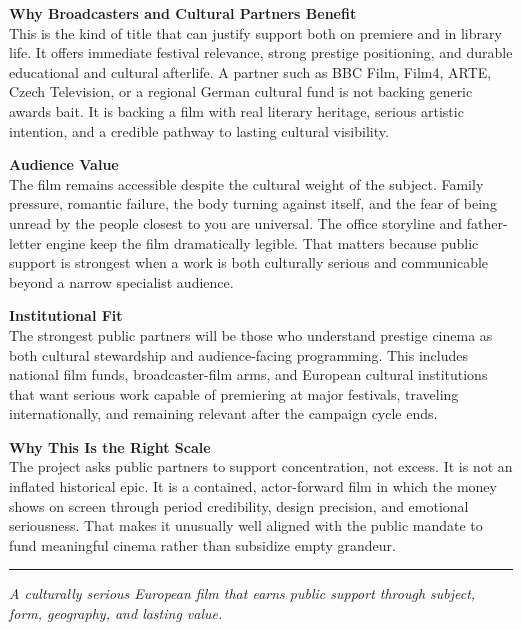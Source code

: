 \documentclass[11pt,letterpaper]{article}
\begin{document}
\textbf{Why Broadcasters and Cultural Partners Benefit}\\
This is the kind of title that can justify support both on premiere and in library life. It offers immediate festival relevance, strong prestige positioning, and durable educational and cultural afterlife. A partner such as BBC Film, Film4, ARTE, Czech Television, or a regional German cultural fund is not backing generic awards bait. It is backing a film with real literary heritage, serious artistic intention, and a credible pathway to lasting cultural visibility.

\vspace{2pt}

\textbf{Audience Value}\\
The film remains accessible despite the cultural weight of the subject. Family pressure, romantic failure, the body turning against itself, and the fear of being unread by the people closest to you are universal. The office storyline and father-letter engine keep the film dramatically legible. That matters because public support is strongest when a work is both culturally serious and communicable beyond a narrow specialist audience.

\vspace{2pt}

\textbf{Institutional Fit}\\
The strongest public partners will be those who understand prestige cinema as both cultural stewardship and audience-facing programming. This includes national film funds, broadcaster-film arms, and European cultural institutions that want serious work capable of premiering at major festivals, traveling internationally, and remaining relevant after the campaign cycle ends.

\vspace{2pt}

\textbf{Why This Is the Right Scale}\\
The project asks public partners to support concentration, not excess. It is not an inflated historical epic. It is a contained, actor-forward film in which the money shows on screen through period credibility, design precision, and emotional seriousness. That makes it unusually well aligned with the public mandate to fund meaningful cinema rather than subsidize empty grandeur.

\vspace{4pt}
\textcolor{sectionrule}{\rule{\textwidth}{0.5pt}}
\vspace{2pt}
\begin{center}
{\small\color{kafkalight}\textit{A culturally serious European film that earns public support through subject, form, geography, and lasting value.}}
\end{center}
\end{document}
